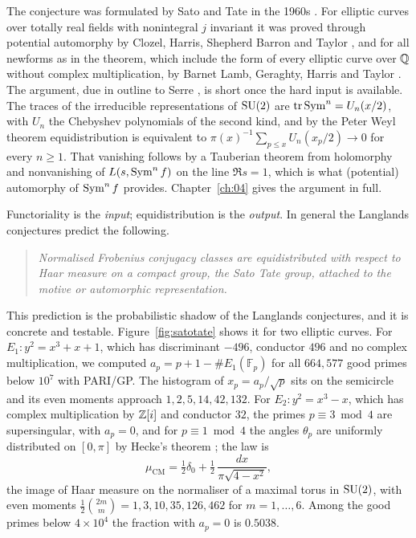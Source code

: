 The conjecture was formulated by Sato and Tate in the 1960s \cite{tate1965}. For elliptic curves over totally real fields with nonintegral $j$ invariant it was proved through potential automorphy by Clozel, Harris, Shepherd Barron and Taylor \cite{cht2008,taylor2008,hsbt2010}, and for all newforms as in the theorem, which include the form of every elliptic curve over $\mathbb{Q}$ without complex multiplication, by Barnet Lamb, Geraghty, Harris and Taylor \cite{blght2011}. The argument, due in outline to Serre \cite{serre1968}, is short once the hard input is available. The traces of the irreducible representations of $\mathrm{SU}(2)$ are $\operatorname{tr}\operatorname{Sym}^n=U_n(x/2)$, with $U_n$ the Chebyshev polynomials of the second kind, and by the Peter Weyl theorem equidistribution is equivalent to $\pi(x)^{-1}\sum_{p\le x}U_n(x_p/2)\to0$ for every $n\ge1$. That vanishing follows by a Tauberian theorem from holomorphy and nonvanishing of $L(s,\operatorname{Sym}^nf)$ on the line $\Re s=1$, which is what (potential) automorphy of $\operatorname{Sym}^nf$ provides. Chapter~\ref{ch:04} gives the argument in full.

Functoriality is the \emph{input}; equidistribution is the \emph{output}. In general the Langlands conjectures predict the following.

\begin{quote}
\emph{Normalised Frobenius conjugacy classes are equidistributed with respect to Haar measure on a compact group, the Sato Tate group, attached to the motive or automorphic representation.}
\end{quote}

This prediction is the probabilistic shadow of the Langlands conjectures, and it is concrete and testable. Figure~\ref{fig:satotate} shows it for two elliptic curves. For $E_1:y^2=x^3+x+1$, which has discriminant $-496$, conductor $496$ and no complex multiplication, we computed $a_p=p+1-\#E_1(\mathbb{F}_p)$ for all $664{,}577$ good primes below $10^7$ with PARI/GP. The histogram of $x_p=a_p/\sqrt p$ sits on the semicircle and its even moments approach $1,2,5,14,42,132$. For $E_2:y^2=x^3-x$, which has complex multiplication by $\mathbb{Z}[i]$ and conductor $32$, the primes $p\equiv3\bmod4$ are supersingular, with $a_p=0$, and for $p\equiv1\bmod4$ the angles $\theta_p$ are uniformly distributed on $[0,\pi]$ by Hecke's theorem \cite{hecke1918}; the law is
\[
\mu_{\mathrm{CM}}=\tfrac12\delta_0+\tfrac12\,\frac{dx}{\pi\sqrt{4-x^2}},
\]
the image of Haar measure on the normaliser of a maximal torus in $\mathrm{SU}(2)$, with even moments $\tfrac12\binom{2m}{m}=1,3,10,35,126,462$ for $m=1,\dots,6$. Among the good primes below $4\times10^4$ the fraction with $a_p=0$ is $0.5038$.

